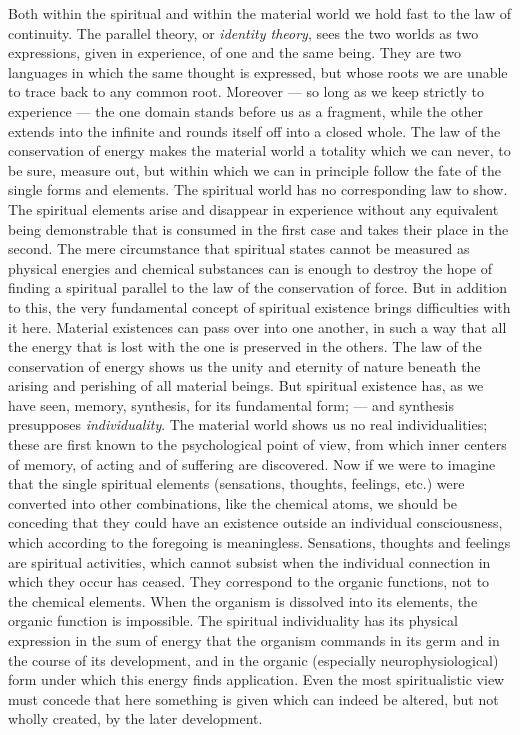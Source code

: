 \documentclass[12pt,a4paper]{book}
\newcommand{\opage}[1]{\marginnote{\footnotesize\textit{[#1]}}}
\begin{document}
Both within the spiritual and within the material world we hold fast to
the law of continuity. The parallel theory, or \emph{identity theory},
sees the two worlds as two expressions, given in experience, of one and
the same being. They are two languages in which the same thought is
expressed, but whose roots we are unable to trace back to any common
root. Moreover --- so long as we keep strictly to experience --- the one
domain stands before us as a fragment, while the other extends into the
infinite and rounds itself off into a closed whole. The law of the
conservation of energy makes the material world a totality which we can
never, to be sure, measure out, but within which we can in principle
follow the fate of the single forms and elements. The spiritual world
has no corresponding law to show. The spiritual elements arise and
disappear in experience without any equivalent being demonstrable that
is consumed in the first case and takes their place in the second. The
mere circumstance that spiritual states cannot be measured as physical
energies and chemical substances can is enough to destroy the hope of
finding a spiritual parallel
\opage{79}to the law of the conservation of force. But in addition to
this, the very fundamental concept of spiritual existence brings
difficulties with it here. Material existences can pass over into one
another, in such a way that all the energy that is lost with the one is
preserved in the others. The law of the conservation of energy shows us
the unity and eternity of nature beneath the arising and perishing of
all material beings. But spiritual existence has, as we have seen,
memory, synthesis, for its fundamental form; --- and synthesis
presupposes \emph{individuality}. The material world shows us no real
individualities; these are first known to the psychological point of
view, from which inner centers of memory, of acting and of suffering are
discovered. Now if we were to imagine that the single spiritual elements
(sensations, thoughts, feelings, etc.) were converted into other
combinations, like the chemical atoms, we should be conceding that they
could have an existence outside an individual consciousness, which
according to the foregoing is meaningless. Sensations, thoughts and
feelings are spiritual activities, which cannot subsist when the
individual connection in which they occur has ceased. They correspond to
the organic functions, not to the chemical elements. When the organism
is dissolved into its elements, the organic function is impossible. The
spiritual individuality has its physical expression in the sum of
energy that the organism commands in its germ and in the course of its
development, and in the organic (especially neurophysiological) form
under which this energy finds application. Even the most spiritualistic
view must concede that here something is given which can indeed be
altered, but not wholly created, by the later development.
\end{document}
